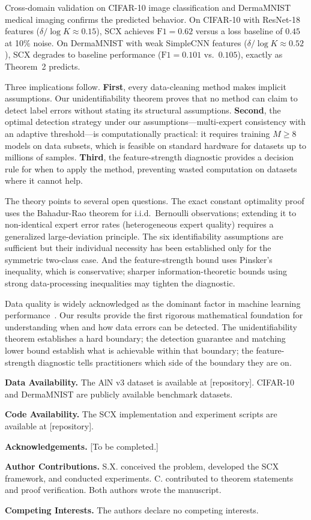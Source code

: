 Cross-domain validation on CIFAR-10 image classification and DermaMNIST medical imaging confirms the predicted behavior. On CIFAR-10 with ResNet-18 features ($\delta / \log K \approx 0.15$), SCX achieves $\mathrm{F1}=0.62$ versus a loss baseline of $0.45$ at 10\% noise. On DermaMNIST with weak SimpleCNN features ($\delta / \log K \approx 0.52$), SCX degrades to baseline performance ($\mathrm{F1}=0.101$ vs.\ $0.105$), exactly as Theorem~2 predicts.

Three implications follow. \textbf{First}, every data-cleaning method makes implicit assumptions. Our unidentifiability theorem proves that no method can claim to detect label errors without stating its structural assumptions. \textbf{Second}, the optimal detection strategy under our assumptions---multi-expert consistency with an adaptive threshold---is computationally practical: it requires training $M \geq 8$ models on data subsets, which is feasible on standard hardware for datasets up to millions of samples. \textbf{Third}, the feature-strength diagnostic provides a decision rule for when to apply the method, preventing wasted computation on datasets where it cannot help.

The theory points to several open questions. The exact constant optimality proof uses the Bahadur-Rao theorem for i.i.d.\ Bernoulli observations; extending it to non-identical expert error rates (heterogeneous expert quality) requires a generalized large-deviation principle. The six identifiability assumptions are sufficient but their individual necessity has been established only for the symmetric two-class case. And the feature-strength bound uses Pinsker's inequality, which is conservative; sharper information-theoretic bounds using strong data-processing inequalities may tighten the diagnostic.

Data quality is widely acknowledged as the dominant factor in machine learning performance~\cite{...}. Our results provide the first rigorous mathematical foundation for understanding when and how data errors can be detected. The unidentifiability theorem establishes a hard boundary; the detection guarantee and matching lower bound establish what is achievable within that boundary; the feature-strength diagnostic tells practitioners which side of the boundary they are on.

\begin{flushleft}
\textbf{Data Availability.} The AlN v3 dataset is available at [repository]. CIFAR-10 and DermaMNIST are publicly available benchmark datasets.

\textbf{Code Availability.} The SCX implementation and experiment scripts are available at [repository].

\textbf{Acknowledgements.} [To be completed.]

\textbf{Author Contributions.} S.X. conceived the problem, developed the SCX framework, and conducted experiments. C. contributed to theorem statements and proof verification. Both authors wrote the manuscript.

\textbf{Competing Interests.} The authors declare no competing interests.
\end{flushleft}


